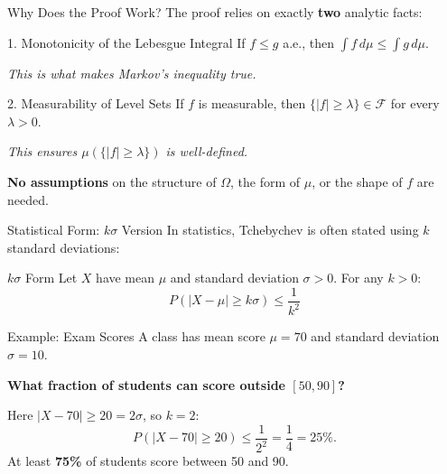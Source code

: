 \documentclass{beamer}
\begin{document}
\begin{frame}{Why Does the Proof Work?}
    The proof relies on exactly \textbf{two} analytic facts:

    \vspace{0.4cm}
    \begin{block}{1. Monotonicity of the Lebesgue Integral}
        If $f \leq g$ a.e., then $\int f \, d\mu \leq \int g \, d\mu$.

        \vspace{0.2cm}
        \textit{This is what makes Markov's inequality true.}
    \end{block}

    \vspace{0.3cm}
    \begin{block}{2. Measurability of Level Sets}
        If $f$ is measurable, then $\{|f| \geq \lambda\} \in \mathscr{F}$ for every $\lambda > 0$.

        \vspace{0.2cm}
        \textit{This ensures $\mu(\{|f| \geq \lambda\})$ is well-defined.}
    \end{block}

    \vspace{0.4cm}
    \begin{center}
        \textbf{No assumptions} on the structure of $\Omega$, the form of $\mu$, or the shape of $f$ are needed.
    \end{center}
\end{frame}

\begin{frame}{Statistical Form: $k\sigma$ Version}
    In statistics, Tchebychev is often stated using $k$ standard deviations:

    \begin{block}{$k\sigma$ Form}
        Let $X$ have mean $\mu$ and standard deviation $\sigma > 0$. For any $k > 0$:
        \[
            P(|X - \mu| \geq k\sigma) \leq \frac{1}{k^2}
        \]
    \end{block}

    \begin{exampleblock}{Example: Exam Scores}
        A class has mean score $\mu = 70$ and standard deviation $\sigma = 10$.

        \vspace{0.2cm}
        \textbf{What fraction of students can score outside $[50, 90]$?}

        \vspace{0.2cm}
        Here $|X - 70| \geq 20 = 2\sigma$, so $k = 2$:
        \[
            P(|X - 70| \geq 20) \leq \frac{1}{2^2} = \frac{1}{4} = 25\%.
        \]
        At least \textbf{75\%} of students score between 50 and 90.
    \end{exampleblock}
\end{frame}
\end{document}
